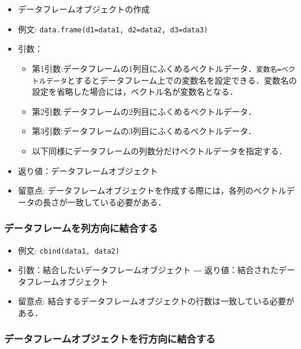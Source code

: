 \documentclass[
  xelatex, ja=standard]{bxjsarticle}
\providecommand{\tightlist}{%
  \setlength{\itemsep}{0pt}\setlength{\parskip}{0pt}}
\begin{document}
\begin{itemize}
\tightlist
\item
  データフレームオブジェクトの作成
\item
  例文: \texttt{data.frame(d1=data1,\ d2=data2,\ d3=data3)}
\item
  引数：

  \begin{itemize}
  \tightlist
  \item
    第1引数:データフレームの1列目にふくめるベクトルデータ．\texttt{変数名=ベクトルデータ}とするとデータフレーム上での変数名を設定できる．変数名の設定を省略した場合には，ベクトル名が変数名となる．
  \item
    第2引数:データフレームの2列目にふくめるベクトルデータ．
  \item
    第3引数:データフレームの3列目にふくめるベクトルデータ．
  \item
    以下同様にデータフレームの列数分だけベクトルデータを指定する．
  \end{itemize}
\item
  返り値：データフレームオブジェクト
\item
  留意点:
  データフレームオブジェクトを作成する際には，各列のベクトルデータの長さが一致している必要がある．
\end{itemize}

\subsubsection{データフレームを列方向に結合する}\label{ux30c7ux30fcux30bfux30d5ux30ecux30fcux30e0ux3092ux5217ux65b9ux5411ux306bux7d50ux5408ux3059ux308b}

\begin{itemize}
\tightlist
\item
  例文: \texttt{cbind(data1,\ data2)}
\item
  引数：結合したいデータフレームオブジェクト ―
  返り値：結合されたデータフレームオブジェクト
\item
  留意点:
  結合するデータフレームオブジェクトの行数は一致している必要がある．
\end{itemize}

\subsubsection{データフレームオブジェクトを行方向に結合する}\label{ux30c7ux30fcux30bfux30d5ux30ecux30fcux30e0ux30aaux30d6ux30b8ux30a7ux30afux30c8ux3092ux884cux65b9ux5411ux306bux7d50ux5408ux3059ux308b}
\end{document}
